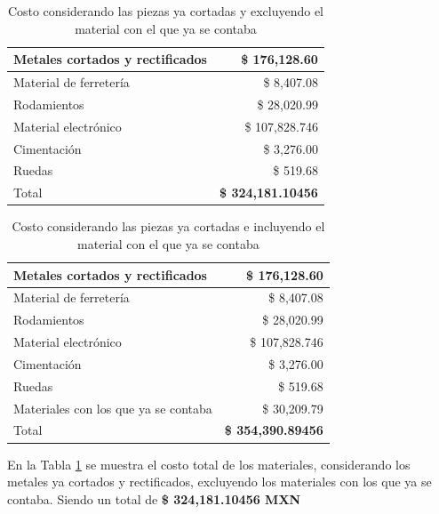 \begin{table}[H]
  \centering
  \caption{Costo considerando las piezas ya cortadas y excluyendo el material con el que ya se contaba}
    \begin{tabular}{|l|r|}
    \hline
     Metales cortados y rectificados  &  \$  176,128.60  \\
    \hline
     Material de ferretería  &  \$      8,407.08  \\
    \hline
     Rodamientos  &  \$    28,020.99  \\
    \hline
     Material electrónico  & \$    107,828.746 \\
    \hline
     Cimentación  &  \$      3,276.00  \\
    \hline
     Ruedas  &  \$          519.68  \\
    \hline
     Total  & \textcolor[rgb]{ 1,  0,  0}{\textbf{ \$  324,181.10456 }} \\
    \hline
    \end{tabular}%
  \label{tab:MeSin}%
\end{table}%


\begin{table}[H]
  \centering
  \caption{Costo considerando las piezas ya cortadas e incluyendo el material con el que ya se contaba}
    \begin{tabular}{|l|r|}
    \hline
     Metales cortados y rectificados  &  \$  176,128.60  \\
    \hline
     Material de ferretería  &  \$      8,407.08  \\
    \hline
     Rodamientos  &  \$    28,020.99  \\
    \hline
     Material electrónico  &  \$  107,828.746  \\
    \hline
     Cimentación  &  \$      3,276.00  \\
    \hline
     Ruedas  &  \$          519.68  \\
    \hline
    Materiales con los que ya se contaba &  \$    30,209.79  \\
    \hline
    Total & \textcolor[rgb]{ 1,  0,  0}{\textbf{ \$  354,390.89456 }} \\
    \hline
    \end{tabular}%
  \label{tab:MeCon}%
\end{table}%

En la Tabla \ref{tab:MeSin} se muestra el costo total de los materiales, considerando los metales ya cortados y rectificados, excluyendo los materiales con los que ya se contaba. Siendo un total de \textcolor[rgb]{ 1,  0,  0}{\textbf{ \$ 324,181.10456 MXN }}\\

